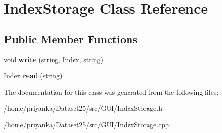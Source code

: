 \hypertarget{classIndexStorage}{\section{\-Index\-Storage \-Class \-Reference}
\label{classIndexStorage}
}
\subsection*{\-Public \-Member \-Functions}
\begin{DoxyCompactItemize}
\item 
\hypertarget{classIndexStorage_a6bae45234b690eb9ffca45b3033de28a}{void {\bfseries write} (string, \hyperlink{classIndex}{\-Index}, string)}\label{classIndexStorage_a6bae45234b690eb9ffca45b3033de28a}

\item 
\hypertarget{classIndexStorage_adfb66513f7c684d6df29d73f92f62a9c}{\hyperlink{classIndex}{\-Index} {\bfseries read} (string)}\label{classIndexStorage_adfb66513f7c684d6df29d73f92f62a9c}

\end{DoxyCompactItemize}


\-The documentation for this class was generated from the following files\-:\begin{DoxyCompactItemize}
\item 
/home/priyanka/\-Dataset25/src/\-G\-U\-I/\-Index\-Storage.\-h\item 
/home/priyanka/\-Dataset25/src/\-G\-U\-I/\-Index\-Storage.\-cpp\end{DoxyCompactItemize}
